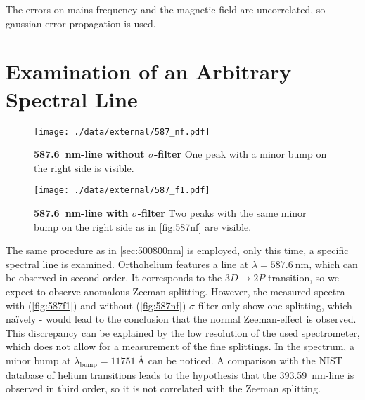 The errors on mains frequency and the magnetic field are uncorrelated, so gaussian error propagation is used. 

\section{Examination of an Arbitrary Spectral Line}
\begin{figure}[tbp]
	\centering
	\texttt{[image: ./data/external/587\_nf.pdf]}
	\caption[\SI{587.6}{\nm}-line w/o $\sigma$-filter]{\textbf{\SI{587.6}{\nm}-line without $\sigma$-filter} One peak with a minor bump on the right side is visible.}
	\label{fig:587nf}
\end{figure}
\begin{figure}[tbp]
	\centering
	\texttt{[image: ./data/external/587\_f1.pdf]}
	\caption[\SI{587.6}{\nm}-line with $\sigma$-filter]{\textbf{\SI{587.6}{\nm}-line with $\sigma$-filter} Two peaks with the same minor bump on the right side as in \autoref{fig:587nf} are visible.}
	\label{fig:587f1}
\end{figure}
The same procedure as in \autoref{sec:500800nm} is employed, only this time, a specific spectral line is examined.
Orthohelium features a line at $\lambda=\SI{587.6}{\nm}$\cite{hetrans}, which can be observed in second order.
It corresponds to the $3D\rightarrow 2P$ transition, so we expect to observe anomalous Zeeman-splitting.
However, the measured spectra with (\autoref{fig:587f1}) and without (\autoref{fig:587nf}) $\sigma$-filter only show one splitting, which - na\"ively - would lead to the conclusion that the normal Zeeman-effect is observed.
This discrepancy can be explained by the low resolution of the used spectrometer, which does not allow for a measurement of the fine splittings.
In the spectrum, a minor bump at $\lambda_\text{bump}=\SI{11751}{\angstrom}$ can be noticed.
A comparison with the NIST database of helium transitions \cite{hetrans} leads to the hypothesis that the \SI{393.59}{\nm}-line is observed in third order, so it is not correlated with the Zeeman splitting.
